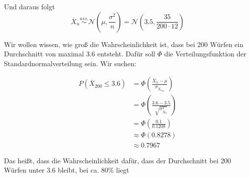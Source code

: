 \documentclass{article}
\begin{document}
Und daraus folgt
\[\overline{X}_n \overset{ass.}{\sim }\mathcal{N}\left(\mu, \frac{\sigma^2}{n}\right) = \mathcal{N}\left(3.5, \frac{35}{200\cdot 12}\right)\]

Wir wollen wissen, wie groß die Wahrscheinlichkeit ist, dass bei 200 Würfen ein Durchschnitt von maximal 3.6 entsteht. Dafür soll $\Phi$ die Verteilungsfunktion der Standardnormalverteilung sein. Wir suchen:

\begin{align*}
    P(\overline{X}_200 \leq 3.6) &= \Phi(\frac{\overline{X}_n - \mu}{\sigma_{\overline{X_n}_n}})\\
    &= \Phi(\frac{3.6 - 3.5}{\sqrt{\sigma^2_{\overline{X}_n}}}) \\
    &= \Phi(\frac{0.1}{0.1208}) \\
    &\approx \Phi(0.8278) \\
    &\approx 0.7967
\end{align*}

Das heißt, dass die Wahrscheinlichkeit dafür, dass der Durchschnitt bei 200 Würfen unter 3.6 bleibt, bei ca. 80\% liegt
\end{document}
